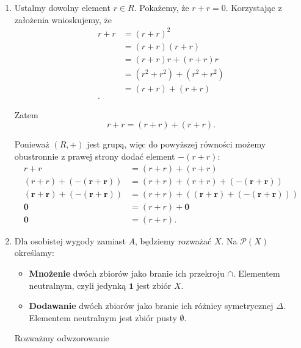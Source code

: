 \begin{solution}
	\begin{enumerate}[label=\alph*)]
		\item Ustalmy dowolny element $r \in R$. Pokażemy, że $r + r = 0$. Korzystając z założenia wnioskujemy, że
		\begin{align*}
			r + r &= \left( r + r \right) ^2 \\
			&= \left( r + r \right) \left( r + r \right)  \\
			&=  \left( r + r \right) r + \left( r + r \right) r \\
			&= (r^2 + r^2) + (r^2 + r^2) \\
			&= (r + r) + (r + r) \\
		.\end{align*} 

		Zatem \[
		r + r = \left(  r+ r \right) + \left( r + r \right)  
		.\] 
	
		Ponieważ $\left( R, + \right)$ jest grupą, więc do powyższej równości możemy obustronnie z prawej strony dodać element $- \left( r + r \right)$:
		\begin{align*}
			r + r &= \left( r + r \right) + \left( r + r \right)  \\
			\left( r + r \right) + \bm{ \left(- \left( r + r \right) \right) } &= \left( r + r \right) + \left( r + r \right) + \bm{  \left( - \left( r + r \right)  \right) }   \\ 
			\bm{ \left( r + r \right) + \left( - \left( r + r \right)  \right)  } &= \left( r + r \right) + \bm{ \left( \left( r + r \right) + \left( - \left( r + r \right)  \right)  \right)  }  \\
			 \mathbf{0}  &= \left( r + r \right) + \mathbf{0}  \\
			 \mathbf{0} &= \left( r + r \right) 
		.\end{align*}
		\item Dla osobistej wygody zamiast $A$, będziemy rozważać  $X$. Na $\mathcal{P}(X) $ określamy:
			\begin{itemize}
				\item \textbf{Mnożenie} dwóch zbiorów jako branie ich przekroju $\cap $. Elementem neutralnym, czyli jedynką $\mathbf{1}$ jest zbiór $X$.
				\item \textbf{Dodawanie} dwóch zbiorów jako branie ich różnicy symetrycznej $\Delta $. Elementem neutralnym jest zbiór pusty $\emptyset $.
			\end{itemize}

			\noindent Rozważmy odwzorowanie 


\end{enumerate}
\end{solution}
